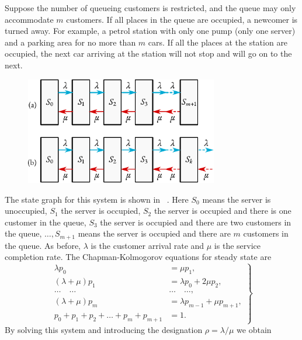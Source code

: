  Suppose	the	number of queueing customers is restricted, and the queue may only accommodate $m$ customers. If all places in the queue are occupied, a newcomer is turned away. For example, a petrol station with only one pump (only one server) and a parking area for no more than $m$ cars. If all the places at the station are occupied, the next car arriving at the station will not stop and will go on to the next.
 \begin{figure}[!h]
 \centering
 \includegraphics[width=0.75\textwidth]{figures/state-graph4.pdf}
 \end{figure}
The state graph for this system is shown in ~. Here $S_{0}$ means the server is unoccupied, $S_{1}$  the server is occupied, $S_{2}$  the server is occupied and there is one customer in the queue, $S_{3}$ the server is occupied and there are two customers in the queue, $\ldots{}, S_{m+1}$ means the server is occupied and there are $m$ customers in the queue. As before, $\lambda$ is the customer arrival rate and $\mu$ is the service completion rate. The Chapman-Kolmogorov equations for steady state are
\begin{equation}%
\left.
\begin{split}
\lambda p_{0} & = \mu p_{1},\\
(\lambda + \mu) p_{1} & = \lambda p_{0} + 2\mu p_{2},\\
\ldots{} \quad \ldots{} \quad & \ldots{} \quad \ldots{} , \\
(\lambda + \mu) p_{m} & = \lambda p_{m-1} + \mu p_{m+1},\\
p_{0} + p_{1} + p_{2} + \ldots + p_{m} + p_{m+1} & = 1.
\end{split}
\right\}
\label{eq-2.7}
\end{equation}
By solving this system and introducing the designation $\rho = \lambda/\mu$ we obtain
